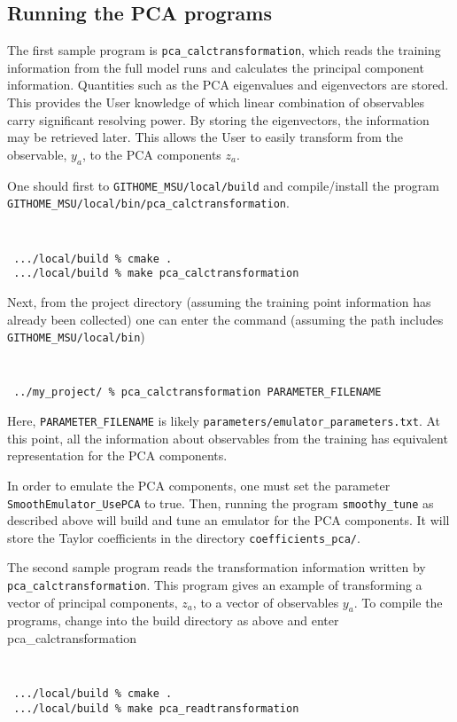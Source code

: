 \documentclass[main.tex]{subfiles}
\begin{document}
\subsection{Running the PCA programs}

The first sample program is {\tt pca\_calctransformation}, which reads the training information from the full model runs and calculates the principal component information. Quantities such as the PCA eigenvalues and eigenvectors are stored. This provides the User knowledge of which linear combination of observables carry significant resolving power. By storing the eigenvectors, the information may be retrieved later. This allows the User to easily transform from the observable, $y_a$, to the PCA components $z_a$. 

One should first to {\tt GITHOME\_MSU/local/build} and compile/install the program\\
{\tt GITHOME\_MSU/local/bin/pca_calctransformation}.
{\tt
\begin{verbatim}
 .../local/build % cmake .
 .../local/build % make pca_calctransformation
 \end{verbatim}
}
Next, from the project directory (assuming the training point information has already been collected) one can enter the command (assuming the path includes {\tt GITHOME\_MSU/local/bin})
{\tt
\begin{verbatim}
 ../my_project/ % pca_calctransformation PARAMETER_FILENAME
 \end{verbatim}
}
Here, {\tt PARAMETER\_FILENAME} is likely {\tt parameters/emulator\_parameters.txt}. At this point, all the information about observables from the training has equivalent representation for the PCA components.

In order to emulate the PCA components, one must set the parameter {\tt SmoothEmulator\_UsePCA} to true. Then, running the program {\tt smoothy\_tune} as described above will build and tune an emulator for the PCA components. It will store the Taylor coefficients in the directory {\tt coefficients\_pca/}.

The second sample program reads the transformation information written by {\tt pca\_calctransformation}. This program gives an example of transforming a vector of principal components, $z_a$, to a vector of observables $y_a$. To compile the programs, change into the build directory as above and enter
pca_calctransformation
{\tt
\begin{verbatim}
 .../local/build % cmake .
 .../local/build % make pca_readtransformation
 \end{verbatim}
}
\end{document}
